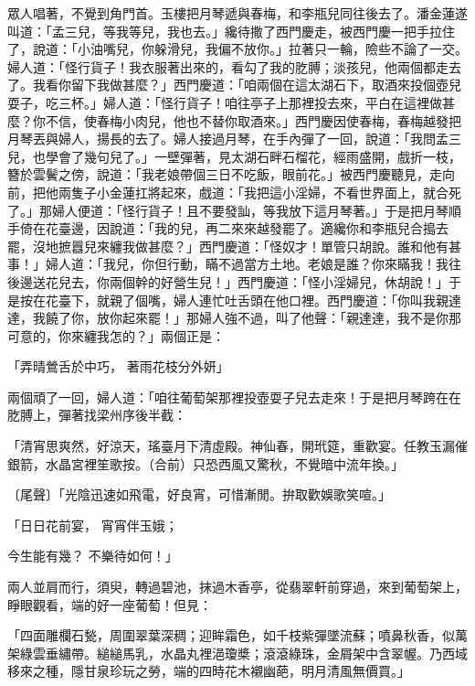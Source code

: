 \begin{showcontents}{}
眾人唱著，不覺到角門首。玉樓把月琴遞與春梅，和李瓶兒同往後去了。潘金蓮遂叫道：「孟三兒，等我等兒，我也去。」纔待撒了西門慶走，被西門慶一把手拉住了，說道：「小油嘴兒，你躲滑兒，我偏不放你。」拉著只一輪，險些不論了一交。婦人道：「怪行貨子！我衣服著出來的，看勾了我的肐膊；淡孩兒，他兩個都走去了。我看你留下我做甚麼？」西門慶道：「咱兩個在這太湖石下，取酒來投個壺兒耍子，吃三杯。」婦人道：「怪行貨子！咱往亭子上那裡投去來，平白在這裡做甚麼？你不信，使春梅小肉兒，他也不替你取酒來。」西門慶因使春梅，春梅越發把月琴丟與婦人，揚長的去了。婦人接過月琴，在手內彈了一回，說道：「我問孟三兒，也學會了幾句兒了。」一壁彈著，見太湖石畔石榴花，經雨盛開，戲折一枝，簪於雲鬢之傍，說道：「我老娘帶個三日不吃飯，眼前花。」被西門慶聽見，走向前，把他兩隻子小金蓮扛將起來，戲道：「我把這小淫婦，不看世界面上，就合死了。」那婦人便道：「怪行貨子！且不要發訕，等我放下這月琴著。」于是把月琴順手倚在花臺邊，因說道：「我的兒，再二來來越發罷了。適纔你和李瓶兒合搗去罷，沒地摭囂兒來纏我做甚麼？」西門慶道：「怪奴才！單管只胡說。誰和他有甚事！」婦人道：「我兒，你但行動，瞞不過當方土地。老娘是誰？你來瞞我！我往後邊送花兒去，你兩個幹的好營生兒！」西門慶道：「怪小淫婦兒，休胡說！」于是按在花臺下，就親了個嘴，婦人連忙吐舌頭在他口裡。西門慶道：「你叫我親達達，我饒了你，放你起來罷！」那婦人強不過，叫了他聲：「親達達，我不是你那可意的，你來纏我怎的？」兩個正是：

「弄晴鶯舌於中巧，  著雨花枝分外妍」

兩個頑了一回，婦人道：「咱往葡萄架那裡投壺耍子兒去走來！于是把月琴跨在在肐膊上，彈著找梁州序後半截：

「清宵思爽然，好涼天，瑤臺月下清虛殿。神仙春，開玳筵，重歡宴。任教玉漏催銀箭，水晶宮裡笙歌按。（合前）只恐西風又驚秋，不覺暗中流年換。」

〔尾聲〕「光陰迅速如飛電，好良宵，可惜漸閒。拚取歡娛歌笑喧。」

「日日花前宴，  宵宵伴玉娥；

今生能有幾？  不樂待如何！」

兩人並肩而行，須臾，轉過碧池，抹過木香亭，從翡翠軒前穿過，來到葡萄架上，睜眼觀看，端的好一座葡萄！但見：

「四面雕欄石甃，周圍翠葉深稠；迎眸霜色，如千枝紫彈墜流蘇；噴鼻秋香，似萬架綠雲垂繡帶。縋縋馬乳，水晶丸裡浥瓊槳；滾滾綠珠，金屑架中含翠幄。乃西域移來之種，隱甘泉珍玩之勞，端的四時花木襯幽葩，明月清風無價買。」


\end{showcontents}
